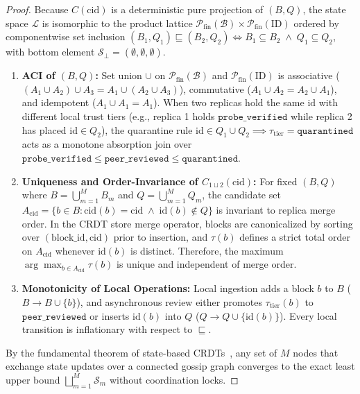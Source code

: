 \documentclass[10pt,twocolumn]{article}
\begin{document}
\begin{proof}
Because $C(\text{cid})$ is a deterministic pure projection of $(B, Q)$, the state space $\mathcal{L}$ is isomorphic to the product lattice $\mathcal{P}_{\text{fin}}(\mathcal{B}) \times \mathcal{P}_{\text{fin}}(\text{ID})$ ordered by componentwise set inclusion $(B_1, Q_1) \sqsubseteq (B_2, Q_2) \iff B_1 \subseteq B_2 \;\wedge\; Q_1 \subseteq Q_2$, with bottom element $\mathcal{S}_{\bot} = (\emptyset, \emptyset, \emptyset)$.
\begin{enumerate}
    \item \textbf{ACI of $(B, Q)$:} Set union $\cup$ on $\mathcal{P}_{\text{fin}}(\mathcal{B})$ and $\mathcal{P}_{\text{fin}}(\text{ID})$ is associative ($(A_1 \cup A_2) \cup A_3 = A_1 \cup (A_2 \cup A_3)$), commutative ($A_1 \cup A_2 = A_2 \cup A_1$), and idempotent ($A_1 \cup A_1 = A_1$). When two replicas hold the same $\text{id}$ with different local trust tiers (e.g., replica 1 holds $\texttt{probe\_verified}$ while replica 2 has placed $\text{id} \in Q_2$), the quarantine rule $\text{id} \in Q_1 \cup Q_2 \implies \tau_{\text{tier}} = \texttt{quarantined}$ acts as a monotone absorption join over $\texttt{probe\_verified} \le \texttt{peer\_reviewed} \le \texttt{quarantined}$.
    \item \textbf{Uniqueness and Order-Invariance of $C_{1 \sqcup 2}(\text{cid})$:} For fixed $(B, Q)$ where $B = \bigcup_{m=1}^M B_m$ and $Q = \bigcup_{m=1}^M Q_m$, the candidate set $A_{\text{cid}} = \{b \in B : \text{cid}(b) = \text{cid} \;\wedge\; \text{id}(b) \notin Q\}$ is invariant to replica merge order. In the CRDT store merge operator, blocks are canonicalized by sorting over $(\text{block\_id}, \text{cid})$ prior to insertion, and $\tau(b)$ defines a strict total order on $A_{\text{cid}}$ whenever $\text{id}(b)$ is distinct. Therefore, the maximum $\arg\max_{b \in A_{\text{cid}}} \tau(b)$ is unique and independent of merge order.
    \item \textbf{Monotonicity of Local Operations:} Local ingestion adds a block $b$ to $B$ ($B \to B \cup \{b\}$), and asynchronous review either promotes $\tau_{\text{tier}}(b)$ to $\texttt{peer\_reviewed}$ or inserts $\text{id}(b)$ into $Q$ ($Q \to Q \cup \{\text{id}(b)\}$). Every local transition is inflationary with respect to $\sqsubseteq$.
\end{enumerate}
By the fundamental theorem of state-based CRDTs~\cite{shapiro2011crdt}, any set of $M$ nodes that exchange state updates over a connected gossip graph converges to the exact least upper bound $\bigsqcup_{m=1}^M \mathcal{S}_m$ without coordination locks.
\end{proof}
\end{document}
